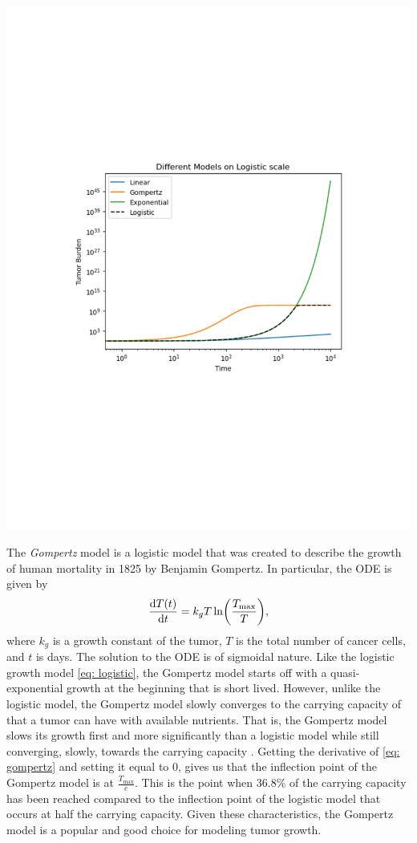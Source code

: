 \documentclass[11pt]{amsart}
\begin{document}
\includegraphics[width=\textwidth]{./images/logistic.pdf}


The \textit{Gompertz} model is a logistic model that was created to describe the growth of human mortality in 1825 by Benjamin Gompertz.
In particular, the ODE is given by
\begin{equation}
	\frac{\mathop{}\!\mathrm{d} T(t)}{\mathop{}\!\mathrm{d} t} = k_g T \ln \biggl(\frac{T_{\max}}{T} \biggr) \label{eq: gompertz},
\end{equation}
where $k_g$ is a growth constant of the tumor, $T$ is the total number of cancer cells, and $t$ is days.
The solution to the ODE is of sigmoidal nature.
Like the logistic growth model \eqref{eq: logistic}, the Gompertz model starts off with a quasi-exponential growth at the beginning that is short lived.
However, unlike the logistic model, the Gompertz model slowly converges to the carrying capacity of that a tumor can have with available nutrients.
That is, the Gompertz model slows its growth first and more significantly than a logistic model while still converging, slowly, towards the carrying capacity \cite{Steb23} .
Getting the derivative of \eqref{eq: gompertz} and setting it equal to 0, gives us that  the inflection point of the Gompertz model is at $\frac{T_{\max}}{e}$.
This is the point when 36.8\% of the carrying capacity has been reached compared to the inflection point of the logistic model that occurs at half the carrying capacity.
Given these characteristics, the Gompertz model is a popular and good choice for modeling tumor growth.
\end{document}
